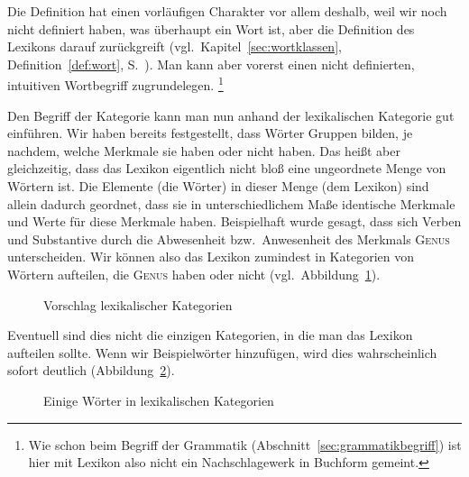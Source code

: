
Die Definition hat einen vorläufigen Charakter vor allem deshalb, weil wir noch nicht definiert haben, was überhaupt ein Wort ist, aber die Definition des Lexikons darauf zurückgreift (vgl.\ Kapitel~\ref{sec:wortklassen}, Definition~\ref{def:wort}, S.~\pageref{def:wort}).
Man kann aber vorerst einen nicht definierten, intuitiven Wortbegriff zugrundelegen.%
\footnote{Wie schon beim Begriff der Grammatik (Abschnitt~\ref{sec:grammatikbegriff}) ist hier mit Lexikon also nicht ein Nachschlagewerk in Buchform gemeint.}


Den Begriff der Kategorie kann man nun anhand der lexikalischen Kategorie gut einführen.
Wir haben bereits festgestellt, dass Wörter Gruppen bilden, je nachdem, welche Merkmale sie haben oder nicht haben.
Das heißt aber gleichzeitig, dass das Lexikon eigentlich nicht bloß eine ungeordnete Menge von Wörtern ist.
Die Elemente (die Wörter) in dieser Menge (dem Lexikon) sind allein dadurch geordnet, dass sie in unterschiedlichem Maße identische Merkmale und Werte für diese Merkmale haben.
Beispielhaft wurde gesagt, dass sich Verben und Substantive durch die Abwesenheit bzw.\ Anwesenheit des Merkmals \textsc{Genus} unterscheiden.
Wir können also das Lexikon zumindest in Kategorien von Wörtern aufteilen, die \textsc{Genus} haben oder nicht (vgl.\ Abbildung~\ref{fig:lexkat01}).

\begin{figure}
  \centering
\caption{Vorschlag lexikalischer Kategorien}
\label{fig:lexkat01}
\end{figure}

Eventuell sind dies nicht die einzigen Kategorien, in die man das Lexikon aufteilen sollte.
Wenn wir Beispielwörter hinzufügen, wird dies wahrscheinlich sofort deutlich (Abbildung~\ref{fig:lexkat1woerter}).

\begin{figure}
  \centering
  \caption{Einige Wörter in lexikalischen Kategorien}
  \label{fig:lexkat1woerter}
\end{figure}

